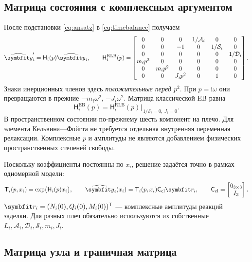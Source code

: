 \documentclass[11pt,a4paper]{article}
\numberwithin{equation}{section}
\newcommand{\ii}{\mathrm i}
\newcommand{\A}{\mathcal A}
\newcommand{\D}{\mathcal D}
\newcommand{\Sbeam}{\mathcal S}
\newcommand{\HH}{\mathsf H}
\newcommand{\TT}{\mathsf T}
\newcommand{\CC}{\mathsf C_{\mathrm{cl}}}
\begin{document}
\subsection{Матрица состояния с комплексным аргументом}

После подстановки \eqref{eq:ansatz} в \eqref{eq:timebalance} получаем
\begin{equation}
 \widehat{\symbfit y}_i'=\HH_i(p)\widehat{\symbfit y}_i,
 \qquad
 \HH_i^{\mathrm{RLB}}(p)=
 \begin{bmatrix}
 0&0&0&1/\A_i&0&0\\
 0&0&-1&0&1/\Sbeam_i&0\\
 0&0&0&0&0&1/\D_i\\
 m_i p^2&0&0&0&0&0\\
 0&m_i p^2&0&0&0&0\\
 0&0&J_i p^2&0&1&0
 \end{bmatrix}.
 \label{eq:Hp}
\end{equation}
Знаки инерционных членов здесь \emph{положительные перед $p^2$}.
При $p=\ii\omega$ они превращаются в прежние $-m_i\omega^2$,
$-J_i\omega^2$. Матрица классической EB равна
\begin{equation}
 \HH_i^{\mathrm{EB}}(p)
 =\HH_i^{\mathrm{RLB}}(p)\big|_{\,1/\Sbeam_i=0,\ J_i=0}.
 \label{eq:Heb}
\end{equation}
В пространственном состоянии по-прежнему шесть компонент на плечо.
Для элемента Кельвина—Фойгта не требуется отдельная внутренняя переменная
релаксации. Комплексные $p$ и амплитуды не являются добавлением физических
пространственных степеней свободы.

Поскольку коэффициенты постоянны по $x_i$, решение задаётся точно в рамках
одномерной модели:
\begin{equation}
 \TT_i(p,x_i)=\exp\bigl(\HH_i(p)x_i\bigr),\qquad
 \widehat{\symbfit y}_i(x_i)=\TT_i(p,x_i)\CC\symbfit r_i,
 \qquad
 \CC=\begin{bmatrix}0_{3\times3}\\I_3\end{bmatrix}.
 \label{eq:transfer}
\end{equation}
$\symbfit r_i=(N_i(0),Q_i(0),M_i(0))^{\mathsf T}$ --- комплексные
амплитуды реакций заделки. Для разных плеч обязательно используются
их собственные $L_i,\A_i,\D_i,\Sbeam_i,m_i,J_i$.

\subsection{Матрица узла и граничная матрица}
\end{document}
